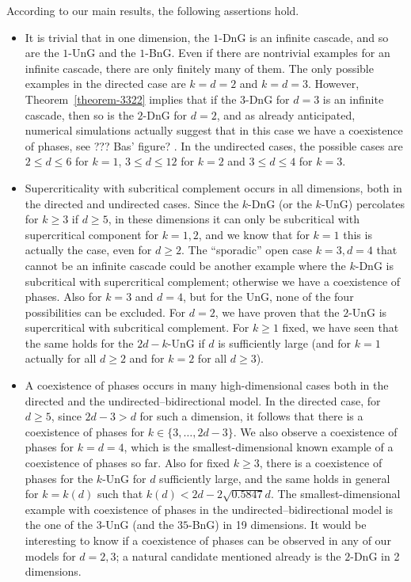 \documentclass{article}
\theoremstyle{definition}
\newcommand{\1}{\mathbbm{1}}
\newcommand{\0}{\mathbf{o}}
\begin{document}
According to our main results, the following assertions hold.
\begin{itemize}
    \item It is trivial that in one dimension, the $1$-DnG is an infinite cascade, and so are the $1$-UnG and the $1$-BnG. Even if there are nontrivial examples for an infinite cascade, there are only finitely many of them. The only possible examples in the directed case are $k=d=2$ and $k=d=3$. However, Theorem~\ref{theorem-3322}  implies that if the $3$-DnG for $d=3$ is an infinite cascade, then so is the $2$-DnG for $d=2$, and as already anticipated, numerical simulations actually suggest that in this case we have a coexistence of phases, see \color{red} ??? Bas' figure? \color{black} . In the undirected cases, the possible cases are $2 \leq d \leq 6$ for $k=1$, $3 \leq d \leq 12$ for $k=2$ and $3 \leq d \leq 4$ for $k=3$.
    \item Supercriticality with subcritical complement occurs in all dimensions, both in the directed and undirected cases. Since the $k$-DnG (or the $k$-UnG) percolates for $k\geq 3$ if $d \geq 5$, in these dimensions it can only be subcritical with supercritical component for $k=1,2$, and we know that for $k=1$ this is actually the case, even for $d \geq 2$. The ``sporadic'' open case $k=3, d=4$ that cannot be an infinite cascade could be another example where the $k$-DnG is subcritical with supercritical complement; otherwise we have a coexistence of phases. Also for $k=3$ and $d=4$, but for the UnG, none of the four possibilities can be excluded. For $d=2$, we have proven that the $2$-UnG is supercritical with subcritical complement. For $k \geq 1$ fixed, we have seen that the same holds for the $2d-k$-UnG if $d$ is sufficiently large (and for $k=1$ actually for all $d \geq 2$ and for $k=2$ for all $d \geq 3$). 
    \item A coexistence of phases occurs in many high-dimensional cases both in the directed and the undirected--bidirectional model. In the directed case, for $d \geq 5$, since $2d-3 > d$ for such a dimension, it follows that there is a coexistence of phases for $k \in \{3, \ldots, 2d-3 \}$.  We also observe a coexistence of phases for $k=d=4$, which is the smallest-dimensional known example of a coexistence of phases so far. Also for fixed $k \geq 3$, there is a coexistence of phases for the $k$-UnG for $d$ sufficiently large, and the same holds in general for $k=k(d)$ such that $k(d) < 2d-2 \sqrt{0.5847}d$. The smallest-dimensional example with coexistence of phases in the undirected--bidirectional model is the one of the $3$-UnG (and the $35$-BnG) in 19 dimensions.  It would be interesting to know if a coexistence of phases can be observed in any of our models for $d=2,3$; a natural candidate mentioned already is the $2$-DnG in 2 dimensions.
\end{itemize}
\end{document}
